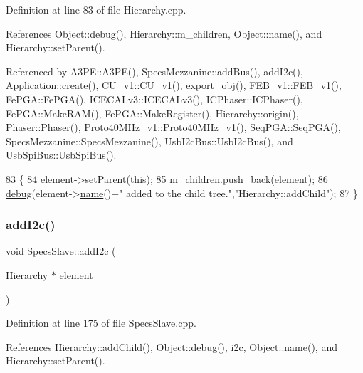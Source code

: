 Definition at line 83 of file Hierarchy.\+cpp.



References Object\+::debug(), Hierarchy\+::m\+\_\+children, Object\+::name(), and Hierarchy\+::set\+Parent().



Referenced by A3\+P\+E\+::\+A3\+P\+E(), Specs\+Mezzanine\+::add\+Bus(), add\+I2c(), Application\+::create(), C\+U\+\_\+v1\+::\+C\+U\+\_\+v1(), export\+\_\+obj(), F\+E\+B\+\_\+v1\+::\+F\+E\+B\+\_\+v1(), Fe\+P\+G\+A\+::\+Fe\+P\+G\+A(), I\+C\+E\+C\+A\+Lv3\+::\+I\+C\+E\+C\+A\+Lv3(), I\+C\+Phaser\+::\+I\+C\+Phaser(), Fe\+P\+G\+A\+::\+Make\+R\+A\+M(), Fe\+P\+G\+A\+::\+Make\+Register(), Hierarchy\+::origin(), Phaser\+::\+Phaser(), Proto40\+M\+Hz\+\_\+v1\+::\+Proto40\+M\+Hz\+\_\+v1(), Seq\+P\+G\+A\+::\+Seq\+P\+G\+A(), Specs\+Mezzanine\+::\+Specs\+Mezzanine(), Usb\+I2c\+Bus\+::\+Usb\+I2c\+Bus(), and Usb\+Spi\+Bus\+::\+Usb\+Spi\+Bus().


\begin{DoxyCode}
83                                           \{
84   element->\hyperlink{classHierarchy_a585ad1aeec16077a0e532ab8b4fc557b}{setParent}(\textcolor{keyword}{this});
85   \hyperlink{classHierarchy_a038816763941fd4a930504917f60483b}{m\_children}.push\_back(element);
86   \hyperlink{classObject_aac010553f022165573714b7014a15f0d}{debug}(element->\hyperlink{classObject_a300f4c05dd468c7bb8b3c968868443c1}{name}()+\textcolor{stringliteral}{" added to the child tree."},\textcolor{stringliteral}{"Hierarchy::addChild"});
87 \}
\end{DoxyCode}
\mbox{\label{classSpecsSlave_af462b4d6e716ceb4bd454ad835938737}} 
\subsubsection{\texorpdfstring{add\+I2c()}{addI2c()}}
{\footnotesize\ttfamily void Specs\+Slave\+::add\+I2c (\begin{DoxyParamCaption}\item[{\hyperlink{classHierarchy}{Hierarchy} $\ast$}]{element }\end{DoxyParamCaption})}



Definition at line 175 of file Specs\+Slave.\+cpp.



References Hierarchy\+::add\+Child(), Object\+::debug(), i2c, Object\+::name(), and Hierarchy\+::set\+Parent().



